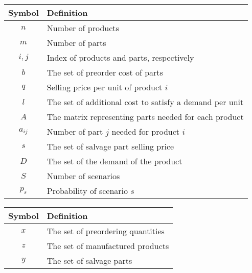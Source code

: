		\begin{center}
		\begin{tabular}{|c|l|}
		\hline
		\textbf{Symbol} & \textbf{Definition}\\
		\hline 
		\multirow{1}{*}{$n$} & \multirow{1}{*}{Number of products}\\
		\hline
		\multirow{1}{*}{$m$} & \multirow{1}{*}{Number of parts}\\
		\hline
		\multirow{1}{*}{$i, j$} & \multirow{1}{*}{Index of products and parts, respectively}\\
		\hline
		\multirow{1}{*}{$b$} & \multirow{1}{*}{The set of preorder cost of parts}\\
		\hline
		\multirow{1}{*}{$q$} & \multirow{1}{*}{Selling price per unit of product $i$}\\
		\hline
		\multirow{1}{*}{$l$} & \multirow{1}{*}{The set of additional cost to satisfy a demand per unit}\\
		\hline
		\multirow{1}{*}{$A$} & \multirow{1}{*}{The matrix representing parts needed for each product}\\
		\hline
		\multirow{1}{*}{$a_{ij}$} & \multirow{1}{*}{Number of part $j$ needed for product $i$}\\
		\hline
		\multirow{1}{*}{$s$} & \multirow{1}{*}{The set of salvage part selling price}\\
		\hline
		\multirow{1}{*}{$D$} & \multirow{1}{*}{The set of the demand of the product}\\
		\hline
		\multirow{1}{*}{$S$} & \multirow{1}{*}{Number of scenarios}\\
		\hline
		\multirow{1}{*}{$p_s$} & \multirow{1}{*}{Probability of scenario $s$}\\
		\hline
		\end{tabular}
		\end{center}


		\begin{center}
		\begin{tabular}{|c|l|}
			\hline
			\textbf{Symbol} & \textbf{Definition}\\
			\hline 
			\multirow{1}{*}{$x$} & \multirow{1}{*}{The set of preordering quantities}\\
			\hline
			\multirow{1}{*}{$z$} & \multirow{1}{*}{The set of manufactured products}\\
			\hline
			\multirow{1}{*}{$y$} & \multirow{1}{*}{The set of salvage parts}\\
			\hline
		\end{tabular}
		\end{center}

